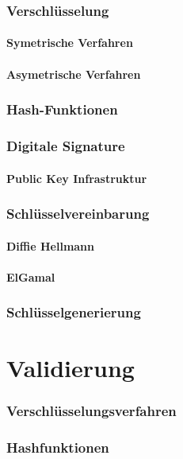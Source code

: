 \documentclass[11pt, a4paper]{scrreprt}
\begin{document}
\section{Verschlüsselung}
\subsection{Symetrische Verfahren}
\subsection{Asymetrische Verfahren}

\section{Hash-Funktionen}
\section{Digitale Signature}
\subsection{Public Key Infrastruktur}
\section{Schlüsselvereinbarung}
\subsection{Diffie Hellmann}
\subsection{ElGamal}
\section{Schlüsselgenerierung}


\part{Validierung}
\section{Verschlüsselungsverfahren}
\section{Hashfunktionen}
\end{document}
